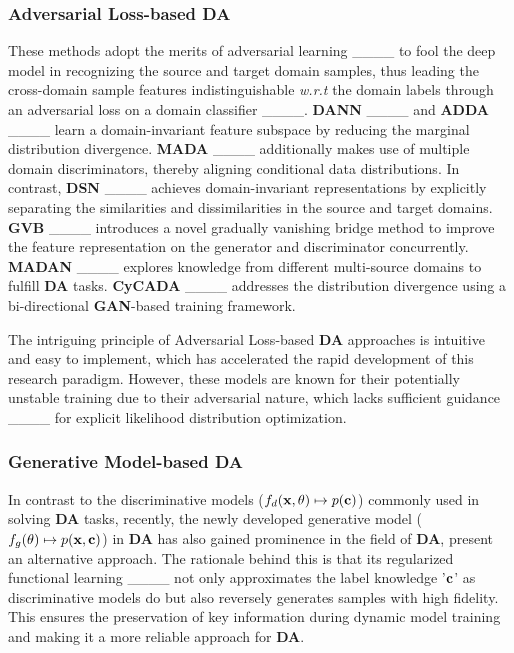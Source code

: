 \subsubsection{Adversarial Loss-based DA}
\label{Adversarial loss-based DA}
These methods adopt the merits of adversarial learning ____ to fool the deep model in recognizing the source and target domain samples, thus leading the cross-domain sample features indistinguishable \textit{w.r.t} the domain labels through an adversarial loss on a domain classifier ____. \textbf{DANN} ____ and \textbf{ADDA} ____ learn a domain-invariant feature subspace by reducing the marginal distribution divergence. \textbf{MADA} ____ additionally makes use of multiple domain discriminators, thereby aligning conditional data distributions.  In contrast, \textbf{DSN} ____ achieves domain-invariant representations by explicitly separating the similarities and dissimilarities in the source and target domains. \textbf{GVB} ____ introduces a novel gradually vanishing bridge method to improve the feature representation on the generator and discriminator concurrently. \textbf{MADAN} ____ explores knowledge from different multi-source domains to fulfill \textbf{DA} tasks. \textbf{CyCADA} ____ addresses the distribution divergence using a bi-directional \textbf{GAN}-based training framework. 


The intriguing principle of Adversarial Loss-based \textbf{DA} approaches is intuitive and easy to implement, which has accelerated the rapid development of this research paradigm. However, these models are known for their potentially unstable training due to their adversarial nature, which lacks sufficient guidance ____ for explicit likelihood distribution optimization.


\subsubsection{Generative Model-based DA}
\label{Generative Model-based DA}


In contrast to the discriminative models (${f_d}({\bf{x}},\theta ) \mapsto p({\bf{c}})$) commonly used in solving \textbf{DA} tasks, recently, the newly developed generative model (${f_g}(\theta ) \mapsto p({\bf{x}},{\bf{c}})$) in \textbf{DA} has also gained prominence in the field of \textbf{DA}, present an alternative approach. The rationale behind this is that its regularized functional learning ____ not only approximates the label knowledge '${\bf{c}}$' as discriminative models do but also reversely generates samples with high fidelity. This ensures the preservation of key information during dynamic model training and making it a more reliable approach for \textbf{DA}. 


